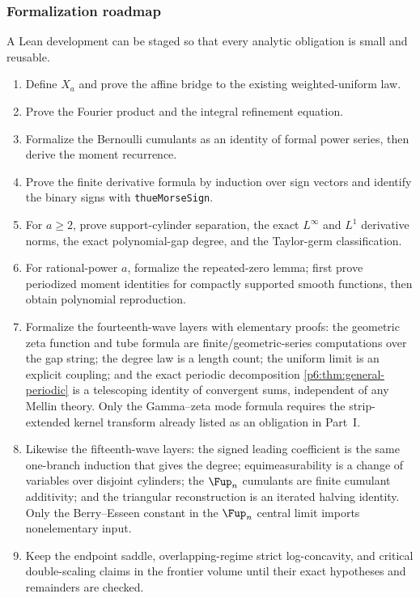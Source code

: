 \documentclass[11pt,oneside]{article}
\numberwithin{equation}{section}
\theoremstyle{definition}
\theoremstyle{remark}
\begin{document}
\subsubsection{Formalization roadmap}
A Lean development can be staged so that every analytic obligation is small and
reusable.
\begin{enumerate}
\item Define $X_a$ and prove the affine bridge to the existing weighted-uniform
law.
\item Prove the Fourier product and the integral refinement equation.
\item Formalize the Bernoulli cumulants as an identity of formal power series,
then derive the moment recurrence.
\item Prove the finite derivative formula by induction over sign vectors and
identify the binary signs with \texttt{thueMorseSign}.
\item For $a\ge2$, prove support-cylinder separation, the exact $L^\infty$
and $L^1$ derivative norms, the exact polynomial-gap degree, and the Taylor-germ
classification.
\item For rational-power $a$, formalize the repeated-zero lemma; first prove
periodized moment identities for compactly supported smooth functions, then
obtain polynomial reproduction.
\item Formalize the fourteenth-wave layers with elementary proofs: the
geometric zeta function and tube formula are finite/geometric-series
computations over the gap string; the degree law is a length count; the
uniform limit is an explicit coupling; and the exact periodic decomposition
\cref{p6:thm:general-periodic} is a telescoping identity of convergent sums,
independent of any Mellin theory.  Only the Gamma--zeta mode formula requires
the strip-extended kernel transform already listed as an obligation in
Part~I.
\item Likewise the fifteenth-wave layers: the signed leading coefficient is
the same one-branch induction that gives the degree; equimeasurability is a
change of variables over disjoint cylinders; the $\Fup_n$ cumulants are
finite cumulant additivity; and the triangular reconstruction is an iterated
halving identity.  Only the Berry--Esseen constant in the $\Fup_n$ central
limit imports nonelementary input.
\item Keep the endpoint saddle, overlapping-regime strict log-concavity, and
critical double-scaling claims in the frontier volume until their exact
hypotheses and remainders are checked.
\end{enumerate}
\end{document}
